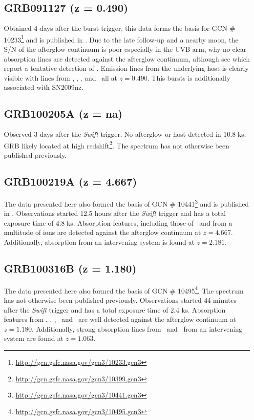 \documentclass{aa}    %
\begin{document}
\subsection{GRB091127 (z = 0.490)}
Obtained 4 days after the burst trigger, this data forms the basis for GCN \#
10233\footnote{\url{http://gcn.gsfc.nasa.gov/gcn3/10233.gcn3}} and is published
in \citet{Vergani2011}. Due to the late follow-up and a nearby moon, the S/N of
the afterglow continuum is poor especially in the UVB arm, why no clear
absorption lines are detected against the afterglow continuum, although see
\citet{Vergani2011} which report a tentative detection of \mgii. Emission lines
from the underlying host is clearly visible with lines from \oii, \hb, \oiii,
and \ha~all at $z = 0.490$. This bursts is additionally associated with
SN2009nz.

\subsection{GRB100205A  (z = na)}
Observed 3 days after the \textit{Swift} trigger. No afterglow or host detected
in 10.8 ks. GRB likely located at high
redshift\footnote{\url{http://gcn.gsfc.nasa.gov/gcn3/10399.gcn3}}. The spectrum
has not otherwise been published previously.

\subsection{GRB100219A (z = 4.667)}
The data presented here also formed the basis of GCN \#
10441\footnote{\url{http://gcn.gsfc.nasa.gov/gcn3/10441.gcn3}} and is published
in \citet{Thone2013}. Observations started 12.5 hours after the \textit{Swift}
trigger and has a total exposure time of 4.8 ks. Absorption features, including
those of \lya~and from a multitude of ions are detected against the afterglow
continuum at $z = 4.667$. Additionally, absorption from an intervening system
is found at $z = 2.181$.

\subsection{GRB100316B (z = 1.180)}
The data presented here also formed the basis of GCN \#
10495\footnote{\url{http://gcn.gsfc.nasa.gov/gcn3/10495.gcn3}}. The spectrum
has not otherwise been published previously. Observations started 44 minutes
after the \textit{Swift} trigger and has a total exposure time of 2.4 ks.
Absorption features from \feii, \alii, \aliii,	\mgii~and \mgi~are well detected
against the afterglow continuum at $z = 1.180$. Additionally, strong absorption
lines from \feii~and \mgii~from an intervening system are found at $z = 1.063$.
\end{document}
